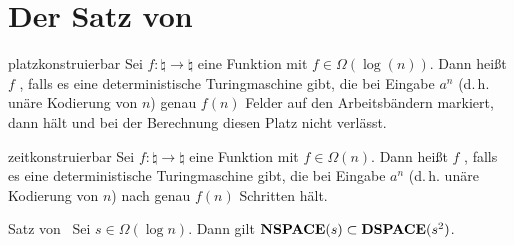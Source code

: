 \pagebreak

\section{%
    Der Satz von %
}

\begin{Def}{platzkonstruierbar}
    Sei $f\colon \natural \rightarrow \natural$ eine Funktion mit $f \in \Omega(\log(n))$.
    Dann heißt $f$ , falls es eine deterministische Turingmaschine
    gibt, die bei Eingabe $a^n$ (d.\,h. unäre Kodierung von $n$) genau $f(n)$ Felder auf den
    Arbeitsbändern markiert, dann hält und bei der Berechnung diesen Platz nicht verlässt.
\end{Def}

\begin{Def}{zeitkonstruierbar}
    Sei $f\colon \natural \rightarrow \natural$ eine Funktion mit $f \in \Omega(n)$.
    Dann heißt $f$ , falls es eine deterministische Turingmaschine
    gibt, die bei Eingabe $a^n$ (d.\,h. unäre Kodierung von $n$) nach genau $f(n)$ Schritten
    hält.
\end{Def}

\linie

\begin{Satz}{Satz von \upshape\,\!}
    Sei $s \in \Omega(\log n)$.
    Dann gilt $\mathbf{NSPACE}(s) \subset \mathbf{DSPACE}(s^2)$.
\end{Satz}


